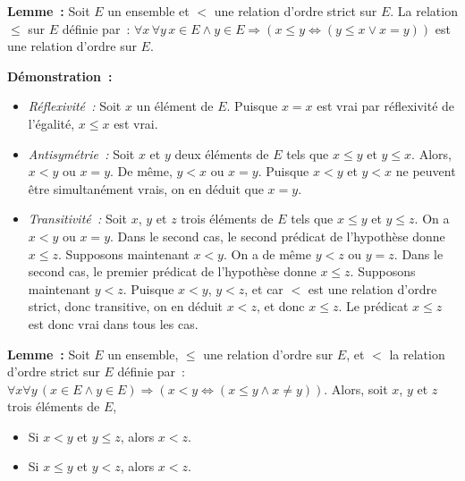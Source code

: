 \hfill\square

\medskip

\noindent\textbf{Lemme :} Soit $E$ un ensemble et $<$ une relation d'ordre strict sur $E$. 
    La relation $\leq$ sur $E$ définie par : $\forall x \, \forall y \, x \in E \wedge y \in E \Rightarrow (x \leq y \Leftrightarrow (y \leq x \vee x = y))$ est une relation d'ordre sur $E$. 

\medskip

\noindent\textbf{Démonstration :} 
\begin{itemize}[nosep]
    \item \textit{Réflexivité :} Soit $x$ un élément de $E$. 
        Puisque $x = x$ est vrai par réflexivité de l'égalité, $x \leq x$ est vrai.
    \item \textit{Antisymétrie :} Soit $x$ et $y$ deux éléments de $E$ tels que $x \leq y$ et $y \leq x$. 
        Alors, $x < y$ ou $x = y$. 
        De même, $y < x$ ou $x = y$. 
        Puisque $x < y$ et $y < x$ ne peuvent être simultanément vrais, on en déduit que $x = y$.
    \item \textit{Transitivité :} Soit $x$, $y$ et $z$ trois éléments de $E$ tels que $x \leq y$ et $y \leq z$. 
        On a $x < y$ ou $x = y$.
        Dans le second cas, le second prédicat de l'hypothèse donne $x \leq z$.
        Supposons maintenant $x < y$. 
        On a de même $y < z$ ou $y = z$. 
        Dans le second cas, le premier prédicat de l'hypothèse donne $x \leq z$.
        Supposons maintenant $y < z$. 
        Puisque $x < y$, $y < z$, et car $<$ est une relation d'ordre strict, donc transitive, on en déduit $x < z$, et donc $x \leq z$. 
        Le prédicat $x \leq z$ est donc vrai dans tous les cas.
\end{itemize}

\hfill\square

\medskip

\noindent\textbf{Lemme :} Soit $E$ un ensemble, $\leq$ une relation d'ordre sur $E$, et $<$ la relation d'ordre strict sur $E$ définie par : $\forall x \forall y \, (x \in E \wedge y \in E) \Rightarrow (x < y \Leftrightarrow (x \leq y \wedge x \neq y))$.
Alors, soit $x$, $y$ et $z$ trois éléments de $E$, 
\begin{itemize}[nosep]
    \item Si $x < y$ et $y \leq z$, alors $x < z$.
    \item Si $x \leq y$ et $y < z$, alors $x < z$.
\end{itemize}

\medskip

